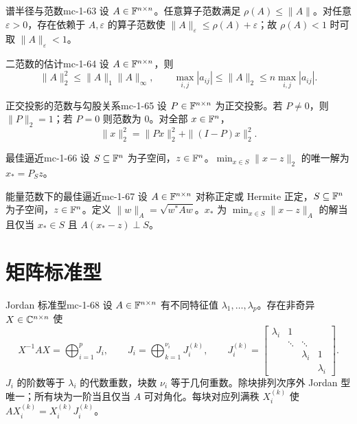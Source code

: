 \begin{theorem}{谱半径与范数}{mc-1-63}
设 $A\in\mathbb{F}^{n\times n}$。任意算子范数满足 $\rho(A)\leq\|A\|$。对任意 $\varepsilon>0$，存在依赖于 $A,\varepsilon$ 的算子范数使 $\|A\|_\varepsilon\leq\rho(A)+\varepsilon$；故 $\rho(A)<1$ 时可取 $\|A\|_\varepsilon<1$。
\end{theorem}

\begin{corollary}{二范数的估计}{mc-1-64}
设 $A\in\mathbb{F}^{n\times n}$，则
\[\|A\|_2^2\leq\|A\|_1\|A\|_\infty,\qquad\max_{i,j}|a_{ij}|\leq\|A\|_2\leq n\max_{i,j}|a_{ij}|.\]
\end{corollary}

\begin{theorem}{正交投影的范数与勾股关系}{mc-1-65}
设 $P\in\mathbb{F}^{n\times n}$ 为正交投影。若 $P\ne0$，则 $\|P\|_2=1$；若 $P=0$ 则范数为 $0$。对全部 $x\in\mathbb{F}^n$，
\[\|x\|_2^2=\|Px\|_2^2+\|(I-P)x\|_2^2.\]
\end{theorem}

\begin{theorem}{最佳逼近}{mc-1-66}
设 $S\subseteq\mathbb{F}^n$ 为子空间，$z\in\mathbb{F}^n$。$\min_{x\in S}\|x-z\|_2$ 的唯一解为 $x_*=P_Sz$。
\end{theorem}

\begin{corollary}{能量范数下的最佳逼近}{mc-1-67}
设 $A\in\mathbb{F}^{n\times n}$ 对称正定或 Hermite 正定，$S\subseteq\mathbb{F}^n$ 为子空间，$z\in\mathbb{F}^n$。定义 $\|w\|_A=\sqrt{w^*Aw}$。$x_*$ 为 $\min_{x\in S}\|x-z\|_A$ 的解当且仅当 $x_*\in S$ 且 $A(x_*-z)\perp S$。
\end{corollary}

\section{矩阵标准型}

\begin{theorem}{Jordan 标准型}{mc-1-68}
设 $A\in\mathbb{F}^{n\times n}$ 有不同特征值 $\lambda_1,\ldots,\lambda_p$。存在非奇异 $X\in\mathbb{C}^{n\times n}$ 使
\[X^{-1}AX=\bigoplus_{i=1}^p J_i,\qquad J_i=\bigoplus_{k=1}^{\nu_i}J_i^{(k)},\qquad
J_i^{(k)}=\begin{bmatrix}\lambda_i&1&&\\&\ddots&\ddots&\\&&\lambda_i&1\\&&&\lambda_i\end{bmatrix}.\]
$J_i$ 的阶数等于 $\lambda_i$ 的代数重数，块数 $\nu_i$ 等于几何重数。除块排列次序外 Jordan 型唯一；所有块为一阶当且仅当 $A$ 可对角化。每块对应列满秩 $X_i^{(k)}$ 使 $AX_i^{(k)}=X_i^{(k)}J_i^{(k)}$。
\end{theorem}

